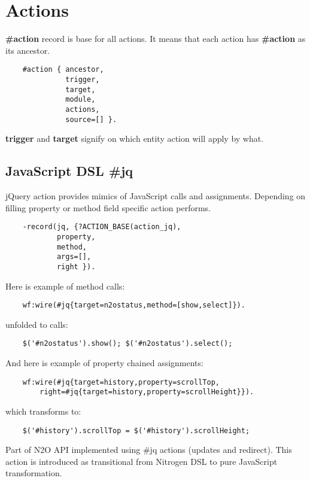 \section{Actions}
{\bf \#action} record is base for all actions. It means that each action
has {\bf \#action} as its ancestor.

\vspace{1\baselineskip}
\begin{lstlisting}
    #action { ancestor,
              trigger,
              target,
              module,
              actions,
              source=[] }.
\end{lstlisting}
\vspace{1\baselineskip}

{\bf trigger} and {\bf target} signify on which entity action will apply by what.

\subsection{JavaScript DSL {\bf \#jq}}
jQuery action provides mimics of JavaScript calls and assignments.
Depending on filling property or method field specific action performs.

\vspace{1\baselineskip}
\begin{lstlisting}
    -record(jq, {?ACTION_BASE(action_jq),
            property,
            method,
            args=[],
            right }).
\end{lstlisting}
\vspace{1\baselineskip}

Here is example of method calls:
\begin{lstlisting}
    wf:wire(#jq{target=n2ostatus,method=[show,select]}).
\end{lstlisting}
unfolded to calls:
\begin{lstlisting}
    $('#n2ostatus').show(); $('#n2ostatus').select();
\end{lstlisting}
\vspace{1\baselineskip}

And here is example of property chained assignments:
\begin{lstlisting}
    wf:wire(#jq{target=history,property=scrollTop,
        right=#jq{target=history,property=scrollHeight}}).
\end{lstlisting}
which transforms to:
\begin{lstlisting}
    $('#history').scrollTop = $('#history').scrollHeight;
\end{lstlisting}
\vspace{1\baselineskip}
Part of N2O API implemented using \#jq actions (updates and redirect).
This action is introduced as transitional from Nitrogen DSL to pure JavaScript transformation.

